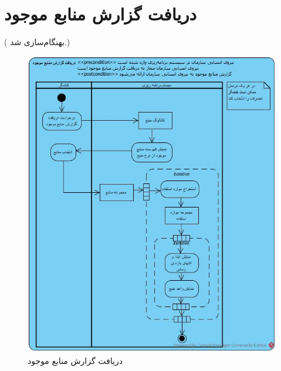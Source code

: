 \section{دریافت گزارش منابع موجود}
({\color{red} بهنگام‌سازی شد.})
\begin{figure}[H]
	\centering
	\includegraphics[scale=0.65]{img/activity/AvailableResourcesReport}
	\caption{دریافت گزارش منابع موجود}
\end{figure}


